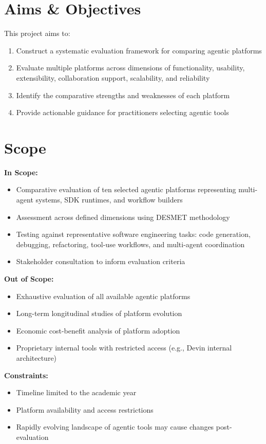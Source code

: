 \documentclass[]
{UCD_CS_FYP_Report}
\begin{document}
\section{Aims \& Objectives}

This project aims to:
\begin{enumerate}
  \item Construct a systematic evaluation framework for comparing agentic platforms
  \item Evaluate multiple platforms across dimensions of functionality, usability, extensibility, collaboration support, scalability, and reliability
  \item Identify the comparative strengths and weaknesses of each platform
  \item Provide actionable guidance for practitioners selecting agentic tools
\end{enumerate}

\section{Scope}

\textbf{In Scope:}
\begin{itemize}
  \item Comparative evaluation of ten selected agentic platforms representing multi-agent systems, SDK runtimes, and workflow builders
  \item Assessment across defined dimensions using DESMET methodology
  \item Testing against representative software engineering tasks: code generation, debugging, refactoring, tool-use workflows, and multi-agent coordination
  \item Stakeholder consultation to inform evaluation criteria
\end{itemize}

\textbf{Out of Scope:}
\begin{itemize}
  \item Exhaustive evaluation of all available agentic platforms
  \item Long-term longitudinal studies of platform evolution
  \item Economic cost-benefit analysis of platform adoption
  \item Proprietary internal tools with restricted access (e.g., Devin internal architecture)
\end{itemize}

\textbf{Constraints:}
\begin{itemize}
  \item Timeline limited to the academic year
  \item Platform availability and access restrictions
  \item Rapidly evolving landscape of agentic tools may cause changes post-evaluation
\end{itemize}
\end{document}
